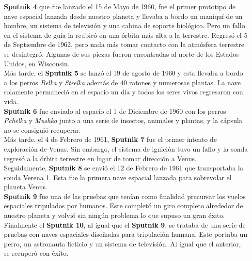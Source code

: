 \documentclass[paper=a4, fontsize=11pt]{scrartcl}
\begin{document}
\textbf{Sputnik 4} que fue lanzado el 15 de Mayo de 1960, fue el primer prototipo de nave espacial lanzada desde nuestro planeta y llevaba a bordo un maniquí de un hombre, un sistema de televisión y una cabina de soporte biológico. Pero un fallo en el sistema de guía la reubicó en una órbita más alta a la terrestre. Regresó el 5 de Septiembre de 1962, pero nada más tomar contacto con la atmósfera terrestre se desintegró. Algunas de sus piezas fueron encontradas al norte de los Estados Unidos, en Wisconsin.\\

Más tarde, el \textbf{Sputnik 5} se lanzó el 19 de agosto de 1960 y esta llevaba a bordo a los perros \textit{Belka} y \textit{Strelka} además de 40 ratones y numerosas plantas. La nave solamente permaneció en el espacio un día y todos los seres vivos regresaron con vida.\\

\textbf{Sputnik 6} fue enviado al espacio el 1 de Diciembre de 1960 con los perros \textit{Pchelka} y \textit{Mushka} junto a una serie de insectos, animales y plantas, y la cápsula no se consiguió recuperar. \\

Más tarde, el 4 de Febrero de 1961, \textbf{Sputnik 7} fue el primer intento de exploración de Venus. Sin embargo, el sistema de ignición tuvo un fallo y la sonda regresó a la órbita terrestre en lugar de tomar dirección a Venus.\\

Seguidamente, \textbf{Sputnik 8} se envió el 12 de Febrero de 1961 que transportaba la sonda Verena 1. Esta fue la primera nave espacial lanzada para sobrevolar el planeta Venus.\\

\textbf{Sputnik 9} fue una de las pruebas que tenían como finalidad precursar los vuelos espaciales tripulados por humanos. Este completó un giro completo alrededor de nuestro planeta y volvió sin ningún problema lo que supuso un gran éxito.\\

Finalmente el \textbf{Sputnik 10}, al igual que el \textbf{Sputnik 9}, se trataba de una serie de pruebas con naves espaciales diseñadas para tripulación humana. Este portaba un perro, un astronauta ficticio y un sistema de televisión. Al igual que el anterior, se recuperó con éxito.
\end{document}

